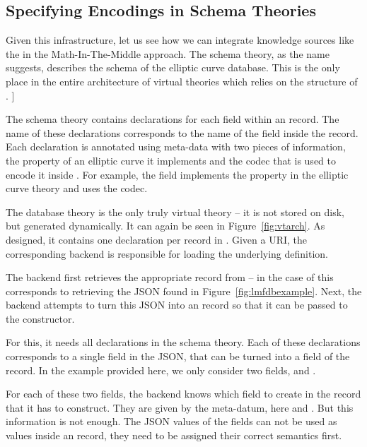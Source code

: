 \subsection{Specifying Encodings in Schema Theories}\label{sec:vt:schema}

Given this infrastructure, let us see how we can integrate knowledge sources like the \lmfdb in the Math-In-The-Middle approach. 
The schema theory, as the name suggests, describes the schema of the \lmfdb elliptic curve database. 
This is the only place in the entire architecture of virtual theories which relies on the structure of \lmfdb. ]

The schema theory contains declarations for each field within an \lmfdb record. 
The name of these declarations corresponds to the name of the field inside the record. 
Each declaration is annotated using \mmt meta-data with two pieces of information, the property of an elliptic curve it implements and the codec that is used to encode it inside \lmfdb. 
For example, the  field implements the  property in the elliptic curve theory and uses the  codec.

The database theory is the only truly virtual theory -- it is not stored on disk, but generated dynamically. 
It can again be seen in Figure~\ref{fig:vtarch}. 
As designed, it contains one declaration per record in \lmfdb. 
Given a URI, the corresponding backend is responsible for loading the underlying definition.

The backend first retrieves the appropriate record from {\lmfdb} -- in the case of  this corresponds to retrieving the JSON found in Figure~\ref{fig:lmfdbexample}. 
Next, the backend attempts to turn this JSON into an \mmt record so that it can be passed to the  constructor.

For this, it needs all declarations in the schema theory. 
Each of these declarations corresponds to a single field in the JSON, that can be turned into a field of the \mmt record. 
In the example provided here, we only consider two fields,  and .

For each of these two fields, the backend knows which field to create in the \mmt record that it has to construct. 
They are given by the  meta-datum, here  and . 
But this information is not enough. 
The JSON values of the fields can not be used as values inside an \mmt record, they need to be assigned their correct semantics first.

